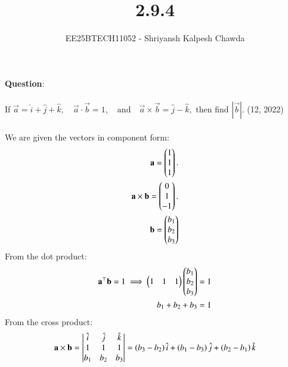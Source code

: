 \documentclass[journal]{IEEEtran}
\begin{document}
	
	
	\vspace{3cm}
	
	\title{2.9.4}
	\author{EE25BTECH11052 - Shriyansh Kalpesh Chawda}


	{\let\newpage\relax\maketitle}
	
	\renewcommand{\thefigure}{\theenumi}
	\renewcommand{\thetable}{\theenumi}
	\setlength{\intextsep}{10pt} 
	
	\renewcommand{\thetable}{\theenumi}
	\textbf{Question}:\\
	\\
	If  $\vec{a} = \hat{i} + \hat{j} + \hat{k}, \quad \vec{a} \cdot \vec{b} = 1, \quad \text{and} \quad \vec{a} \times \vec{b} = \hat{j} - \hat{k},$ then find $|\vec{b}|$.
	\hfill (12, 2022)
	\\
	\solution\\
	We are given the vectors in component form:
	\begin{align}
	 \mathbf{a} = \begin{pmatrix}1 \\ 1 \\ 1\end{pmatrix}.\\
	 \mathbf{a} \times \mathbf{b} = \begin{pmatrix}0 \\ 1 \\ -1\end{pmatrix}.\\
	 \mathbf{b} = \begin{pmatrix}b_1 \\ b_2 \\ b_3\end{pmatrix}
	 \end{align}
	From the dot product: \\
	\begin{align}
	\mathbf{a}^\top \mathbf{b} = 1 \implies
	\begin{pmatrix} 1 & 1 & 1 \end{pmatrix} \begin{pmatrix}b_1 \\ b_2 \\ b_3\end{pmatrix} = 1\\
	b_1 + b_2 + b_3 = 1 
	\end{align}
	From the cross product: \\
\begin{align}     
	\mathbf{a} \times \mathbf{b} = \begin{vmatrix} \hat{i} & \hat{j} & \hat{k} \\ 1 & 1 & 1 \\ b_1 & b_2 & b_3 \end{vmatrix} = \left(b_3 - b_2\right)\hat{i} + \left(b_1 - b_3\right)\hat{j} + \left(b_2 - b_1\right)\hat{k}
\end{align}
\end{document}
